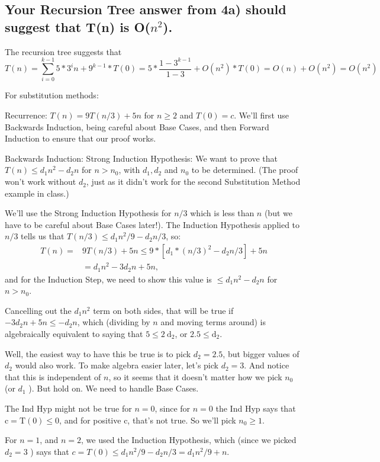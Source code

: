 \documentclass[a4paper]{article}
\begin{document}
\subsection{Your Recursion Tree answer from 4a) should suggest that T(n) is O($n^2$).}
The recursion tree suggests that 
$$T(n)=\sum^{k-1}_{i=0} 5*3^i n + 9^{k-1}*T(0)=5*\frac{1-3^{k-1}}{1-3} +O(n^2)*T(0)=O(n)+O(n^2)=O(n^2)$$ 

For substitution methods:

Recurrence: $T(n)=9 T(n / 3)+5 n$ for $n \geq 2$ and $T(0)=c$. We'll first use Backwards Induction, being careful about Base Cases, and then Forward Induction to ensure that our proof works.

Backwards Induction: Strong Induction Hypothesis: We want to prove that $T(n) \leq d_1 n^2-d_2 n$ for $n>n_0$, with $d_1, d_2$ and $n_0$ to be determined. (The proof won't work without $d_2$, just as it didn't work for the second Substitution Method example in class.)

We'll use the Strong Induction Hypothesis for $n / 3$ which is less than $n$ (but we have to be careful about Base Cases later!). The Induction Hypothesis applied to $n / 3$ tells us that $T(n / 3) \leq d_1 n^2 / 9-d_2 n / 3$, so:
$$
\begin{aligned}
T(n)=& 9 T(n / 3)+5 n \leq 9 *\left[d_1 *(n / 3)^2-d_2 n / 3\right]+5 n \\
&=d_1 n^2-3 d_2 n+5 n,
\end{aligned}
$$
and for the Induction Step, we need to show this value is $\leq d_1 n^2-d_2 n$ for $n>n_0$.

Cancelling out the $d_1 n^2$ term on both sides, that will be true if $-3 d_2 n+5 n \leq-d_2 n$, which (dividing by $n$ and moving terms around) is algebraically equivalent to saying that $5 \leq 2 \mathrm{~d}_2$, or $2.5 \leq \mathrm{d}_2$.

Well, the easiest way to have this be true is to pick $d_2=2.5$, but bigger values of $d_2$ would also work. To make algebra easier later, let's pick $d_2=3$. And notice that this is independent of $n$, so it seems that it doesn't matter how we pick $n_0$ (or $d_1$ ). But hold on. We need to handle Base Cases.

The Ind Hyp might not be true for $n=0$, since for $n=0$ the Ind Hyp says that $\mathrm{c}=\mathrm{T}(0) \leq 0$, and for positive $\mathrm{c}$, that's not true. So we'll pick $n_0 \geq 1$.

For $n=1$, and $n=2$, we used the Induction Hypothesis, which (since we picked $d_2=3$ ) says that $c=T(0) \leq d_1 n^2 / 9-d_2 n / 3=d_1 n^2 / 9+n$.
\end{document}
